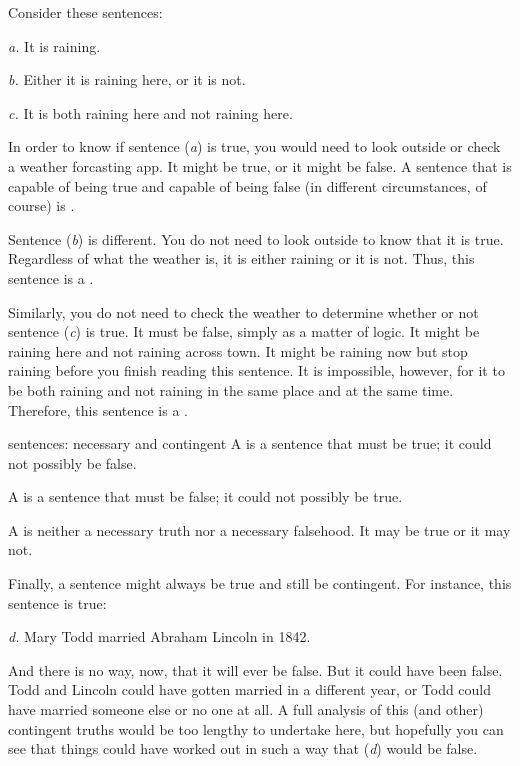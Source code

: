 Consider these sentences:
	\begin{earg}
		\item[\textit{a.}] It is raining.
		\item[\textit{b.}] Either it is raining here, or it is not.
		\item[\textit{c.}] It is both raining here and not raining here.
	\end{earg}
In order to know if sentence (\textit{a}) is true, you would need to look outside or check a weather forcasting app. It might be true, or it might be false. A sentence that is capable of being true and capable of being false (in different circumstances, of course) is .

Sentence (\textit{b}) is different. You do not need to look outside to know that it is true. Regardless of what the weather is, it is either raining or it is not. Thus, this sentence is a . 

Similarly, you do not need to check the weather to determine whether or not sentence (\textit{c}) is true. It must be false, simply as a matter of logic. It might be raining here and not raining across town. It might be raining now but stop raining before you finish reading this sentence. It is impossible, however, for it to be both raining and not raining in the same place and at the same time. Therefore, this sentence is a .

\begin{factboxy}{sentences: necessary and contingent}
\noindent A  is a sentence that must be true; it could not possibly be false.

\noindent A  is a sentence that must be false; it could not possibly be true.

\noindent A  is neither a necessary truth nor a necessary falsehood. It may be true or it may not.
\end{factboxy}

Finally, a sentence might always be true and still be contingent. For instance, this sentence is true: 
	\begin{earg}
		\item[\textit{d.}] Mary Todd married Abraham Lincoln in 1842. 
	\end{earg}
And there is no way, now, that it will ever be false. But it could have been false. Todd and Lincoln could have gotten married in a different  year, or Todd could have married someone else or no one at all. A full analysis of this (and other) contingent truths would be too lengthy to undertake here, but hopefully you can see that things could have worked out in such a way that (\textit{d}) would be false. 

